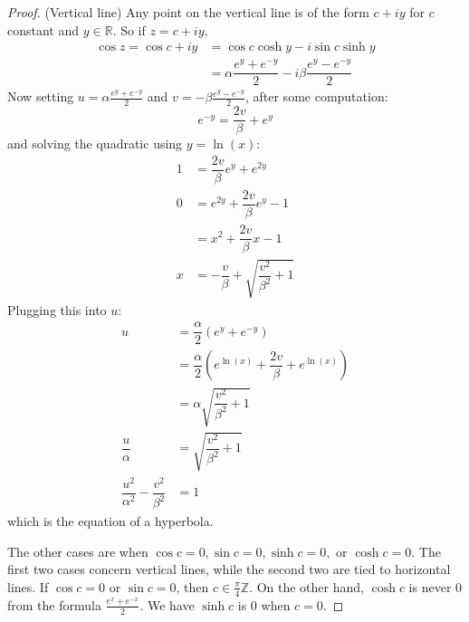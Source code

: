 \documentclass{article}
\begin{document}
\begin{proof}
        (Vertical line) Any point on the vertical line is of the form $c + iy$ for $c$ constant and $y \in \mathbb{R}$. So if $z = c + iy$, 
            \begin{align*}
                \cos{z} = \cos{c + iy} &= \cos{c}\cosh{y} - i\sin{c}\sinh{y}                                   \\
                                       &= \alpha \dfrac{e^{y} + e^{-y}}{2} - i \beta \dfrac{e^{y} - e^{-y}}{2}   
            \end{align*}
        Now setting $u = \alpha \frac{e^{y} + e^{-y}}{2}$ and $v = -\beta \frac{e^{y} - e^{-y}}{2}$, after some computation:
            \begin{equation*}
                e^{-y} = \dfrac{2v}{\beta} + e^{y}
            \end{equation*}
        and solving the quadratic using $y = \ln(x)$:
            \begin{align*}
                1 &= \dfrac{2v}{\beta}e^{y} + e^{2y}                         \\
                0 &= e^{2y} + \dfrac{2v}{\beta}e^{y} - 1                     \\
                  &= x^{2} + \dfrac{2v}{\beta}x - 1                          \\
                x &= -\dfrac{v}{\beta} + \sqrt{\dfrac{v^{2}}{\beta^{2}} + 1}   
            \end{align*}
        Plugging this into $u$:
            \begin{align*}
                u                                                    &= \dfrac{\alpha}{2}\left(e^{y} + e^{-y}\right)                              \\
                                                                     &= \dfrac{\alpha}{2}\left(e^{\ln(x)} + \dfrac{2v}{\beta} + e^{\ln(x)}\right) \\
                                                                     &= \alpha\sqrt{\dfrac{v^{2}}{\beta^{2}} + 1}                                 \\
                \dfrac{u}{\alpha}                                    &= \sqrt{\dfrac{v^{2}}{\beta^{2}} + 1}                                       \\
                \dfrac{u^{2}}{\alpha^{2}} - \dfrac{v^{2}}{\beta^{2}} &= 1                                                                           
            \end{align*}
        which is the equation of a hyperbola.

        The other cases are when $\cos{c} = 0, \sin{c} = 0, \sinh{c} = 0, \text{ or } \cosh{c} = 0$. The first two cases concern vertical lines, while the second two are tied to horizontal lines. If $\cos{c} = 0$ or $\sin{c} = 0$, then $c \in \frac{\pi}{4}\mathbb{Z}$. On the other hand, $\cosh{c}$ is never $0$ from the formula $\frac{e^{x} + e^{-x}}{2}$. We have $\sinh{c}$ is $0$ when $c = 0$.
    \end{proof}
\end{document}

